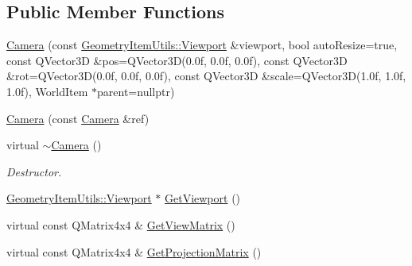 \subsection*{Public Member Functions}
\begin{DoxyCompactItemize}
\item 
\mbox{\hyperlink{class_geometry_engine_1_1_geometry_world_item_1_1_geometry_camera_1_1_camera_a56a7538e5e5d2141832824bba448e271}{Camera}} (const \mbox{\hyperlink{class_geometry_engine_1_1_geometry_item_utils_1_1_viewport}{Geometry\+Item\+Utils\+::\+Viewport}} \&viewport, bool auto\+Resize=true, const Q\+Vector3D \&pos=Q\+Vector3D(0.\+0f, 0.\+0f, 0.\+0f), const Q\+Vector3\+D \&rot=\+Q\+Vector3\+D(0.\+0f, 0.\+0f, 0.\+0f), const Q\+Vector3\+D \&scale=\+Q\+Vector3\+D(1.\+0f, 1.\+0f, 1.\+0f), World\+Item $\ast$parent=nullptr)
\item 
\mbox{\hyperlink{class_geometry_engine_1_1_geometry_world_item_1_1_geometry_camera_1_1_camera_afac761f35401ea99ef72dd2412b71cfc}{Camera}} (const \mbox{\hyperlink{class_geometry_engine_1_1_geometry_world_item_1_1_geometry_camera_1_1_camera}{Camera}} \&ref)
\item 
\mbox{\label{class_geometry_engine_1_1_geometry_world_item_1_1_geometry_camera_1_1_camera_ae9c09265af967800c32373f9c79d56c6}} 
virtual \mbox{\hyperlink{class_geometry_engine_1_1_geometry_world_item_1_1_geometry_camera_1_1_camera_ae9c09265af967800c32373f9c79d56c6}{$\sim$\+Camera}} ()
\begin{DoxyCompactList}\small\item\em Destructor. \end{DoxyCompactList}\item 
\mbox{\hyperlink{class_geometry_engine_1_1_geometry_item_utils_1_1_viewport}{Geometry\+Item\+Utils\+::\+Viewport}} $\ast$ \mbox{\hyperlink{class_geometry_engine_1_1_geometry_world_item_1_1_geometry_camera_1_1_camera_af0cbe2d79ec50e1ecdec1e81be08163e}{Get\+Viewport}} ()
\item 
virtual const Q\+Matrix4x4 \& \mbox{\hyperlink{class_geometry_engine_1_1_geometry_world_item_1_1_geometry_camera_1_1_camera_ab9de69d0f99abc6ca782bc571fd41511}{Get\+View\+Matrix}} ()
\item 
virtual const Q\+Matrix4x4 \& \mbox{\hyperlink{class_geometry_engine_1_1_geometry_world_item_1_1_geometry_camera_1_1_camera_a587af5d501db042b85ccce91eb969f4c}{Get\+Projection\+Matrix}} ()
\item 

\end{DoxyCompactItemize}
